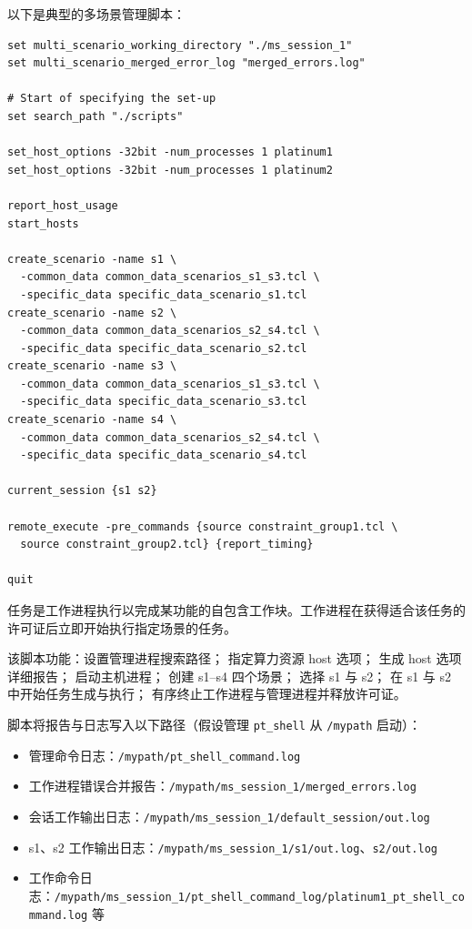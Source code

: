 以下是典型的多场景管理脚本：
\begin{lstlisting}
set multi_scenario_working_directory "./ms_session_1"
set multi_scenario_merged_error_log "merged_errors.log"

# Start of specifying the set-up
set search_path "./scripts"

set_host_options -32bit -num_processes 1 platinum1
set_host_options -32bit -num_processes 1 platinum2

report_host_usage
start_hosts

create_scenario -name s1 \
  -common_data common_data_scenarios_s1_s3.tcl \
  -specific_data specific_data_scenario_s1.tcl
create_scenario -name s2 \
  -common_data common_data_scenarios_s2_s4.tcl \
  -specific_data specific_data_scenario_s2.tcl
create_scenario -name s3 \
  -common_data common_data_scenarios_s1_s3.tcl \
  -specific_data specific_data_scenario_s3.tcl
create_scenario -name s4 \
  -common_data common_data_scenarios_s2_s4.tcl \
  -specific_data specific_data_scenario_s4.tcl

current_session {s1 s2}

remote_execute -pre_commands {source constraint_group1.tcl \
  source constraint_group2.tcl} {report_timing}

quit
\end{lstlisting}

任务是工作进程执行以完成某功能的自包含工作块。工作进程在获得适合该任务的许可证后立即开始执行指定场景的任务。

该脚本功能：设置管理进程搜索路径； 指定算力资源 host 选项； 生成 host 选项详细报告； 启动主机进程； 创建 s1--s4 四个场景； 选择 s1 与 s2； 在 s1 与 s2 中开始任务生成与执行； 有序终止工作进程与管理进程并释放许可证。

脚本将报告与日志写入以下路径（假设管理 \texttt{pt\_shell} 从 \texttt{/mypath} 启动）：
\begin{itemize}
  \item 管理命令日志：\texttt{/mypath/pt\_shell\_command.log}
  \item 工作进程错误合并报告：\texttt{/mypath/ms\_session\_1/merged\_errors.log}
  \item 会话工作输出日志：\texttt{/mypath/ms\_session\_1/default\_session/out.log}
  \item s1、s2 工作输出日志：\texttt{/mypath/ms\_session\_1/s1/out.log}、\texttt{s2/out.log}
  \item 工作命令日志：\texttt{/mypath/ms\_session\_1/pt\_shell\_command\_log/platinum1\_pt\_shell\_command.log} 等
\end{itemize}

